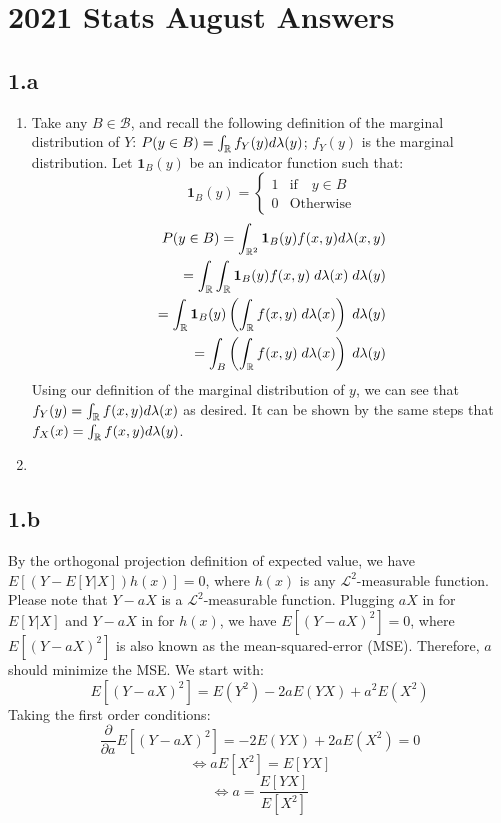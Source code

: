 


\section{2021 Stats August Answers}
\subsection{1.a}
\begin{enumerate}
    \item
    Take any \(B \in \mathcal{B}\), and recall the following definition of the marginal distribution of \(Y\): \(P(y\in B) = \int_{\Bbb R} f_Y(y) d\lambda(y)\); \(f_Y(y)\) is the marginal distribution.  Let \(\mathbf{1}_B(y)\) be an indicator function such that:
    \[
    \mathbf{1}_B(y) =
    \begin{cases}
        1 & \text{if}\quad y\in B \\
        0 & \text{Otherwise}
    \end{cases}
    \]
    \begin{align*}
        P(y\in B) = \int_{\Bbb R^2} \mathbf{1}_B(y) f(x,y) d\lambda(x,y) \\
        = \int_{\Bbb R} \int_{\Bbb R} \mathbf{1}_B(y) f(x,y) \;d\lambda(x) \; d\lambda(y) \\
        = \int_{\Bbb R} \mathbf{1}_B(y) \left (\int_{\Bbb R}  f(x,y) \;d\lambda(x) \right ) \; d\lambda(y) \\
        = \int_B \left (\int_{\Bbb R}  f(x,y) \;d\lambda(x) \right ) \; d\lambda(y) 
    \end{align*}
    Using our definition of the marginal distribution of \(y\), we can see that \(f_Y(y)= \int_{\Bbb R} f(x,y) d\lambda(x)\) as desired.
    It can be shown by the same steps that \(f_X(x)= \int_{\Bbb R} f(x,y) d\lambda(y)\).
    \item
    
\end{enumerate}
\subsection{1.b}
By the orthogonal projection definition of expected value, we have \(E[(Y-E[Y|X])h(x)] = 0\), where \(h(x)\) is any \(\mathcal{L}^2\)-measurable function.  Please note that \(Y-aX\) is a \(\mathcal{L}^2\)-measurable function.  Plugging \(aX\) in for \(E[Y|X]\) and \(Y-aX\) in for \(h(x)\), we have \(E[(Y-aX)^2]=0\), where \(E[(Y-aX)^2]\) is also known as the mean-squared-error (MSE). Therefore, \(a\) should minimize the MSE.  We start with:
\[
E[(Y-aX)^2] = E(Y^2)-2aE(YX)+a^2E(X^2)
\]
Taking the first order conditions:
\[
\frac{\partial}{\partial a}E[(Y-aX)^2] = -2E(YX) + 2aE(X^2)=0
\]
\[
\Leftrightarrow aE[X^2]=E[YX]
\]
\[
\Leftrightarrow a = \frac{E[YX]}{E[X^2]}
\]
